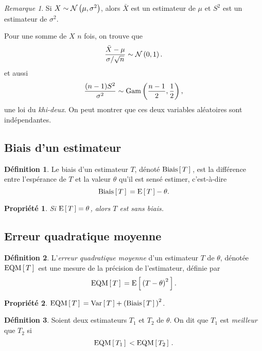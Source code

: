 \documentclass[11pt]{article}
\makeatletter
\newcommand\Gam[2]{%
	\ensuremath{%
		\mathrm{Gam}\left(#1,#2\right)%
	}%
}%
\newcommand\Norm[2]{%
	\ensuremath{%
		\mathcal{N}\left(#1,#2\right)%
	}%
}%
\newcommand\Esp[1]{%
	\ensuremath{%
		\mathrm{E}\left[\,#1\,\right]%
	}%
}%
\newcommand\Var[1]{%
	\ensuremath{%
		\mathrm{Var}\left[\,#1\,\right]%
	}%
}%
\newcommand\Biais[1]{%
	\ensuremath{%
		\mathrm{Biais}\left[\,#1\,\right]\,%
	}%
}%
\newcommand\EQM[1]{%
	\ensuremath{%
		\mathrm{EQM}\left[\,#1\,\right]\,%
	}%
}%
\newtheorem{property}{Propriété}
\theoremstyle{remark}
\newtheorem*{remark}{Remarque}
\theoremstyle{definition}
\newtheorem*{@definition}{Définition}
\newenvironment{definition}{%
	\begin{@definition}%
}{%
	\end{@definition}%
	\setcounter{property}{0}%
}
\makeatother
\begin{document}
\begin{remark}
	Si $X\sim\Norm{\mu}{\sigma^2}$, alors $\bar{X}$ est un estimateur de $\mu$
	et $S^2$ est un estimateur de $\sigma^2$.

	Pour une somme de $X$ $n$ fois, on trouve que
	\begin{equation*}
		\frac{\bar{X}-\mu}{\sigma/\sqrt{n}}\sim\Norm{0}{1}.
	\end{equation*}
	et aussi
	\begin{equation*}
		\frac{(n-1)S^2}{\sigma^2}\sim\Gam{\frac{n-1}{2}}{\frac{1}{2}},
	\end{equation*}
	une loi du \textit{khi-deux}. On peut montrer que ces deux variables
	aléatoires sont indépendantes.
\end{remark}

\subsection{Biais d'un estimateur}
\begin{definition}
	Le biais d'un estimateur $T$, dénoté $\Biais{T}$, est la différence entre
	l'espérance de $T$ et la valeur $\theta$ qu'il est sensé estimer,
	c'est-à-dire
	\begin{equation*}
		\Biais{T}=\Esp{T}-\theta.
	\end{equation*}
\end{definition}

\begin{property}
	Si $\Esp{T}=\theta$, alors $T$ est sans biais.
\end{property}

\subsection{Erreur quadratique moyenne}
\begin{definition}
	L'\textit{erreur quadratique moyenne} d'un estimateur $T$ de $\theta$,
	dénotée $\EQM{T}$ est une mesure de la précision de l'estimateur, définie
	par
	\begin{equation*}
		\EQM{T}=\Esp{\left(T-\theta\right)^2}.
	\end{equation*}
\end{definition}

\begin{property}
	$\EQM{T}=\Var{T}+\left(\Biais{T}\right)^2$.
\end{property}

\begin{definition}
	Soient deux estimateurs $T_1$ et $T_2$ de $\theta$. On dit que $T_1$ est
	\textit{meilleur} que $T_2$ si
	\begin{equation*}
		\EQM{T_1}<\EQM{T_2}.
	\end{equation*}
\end{definition}
\end{document}
